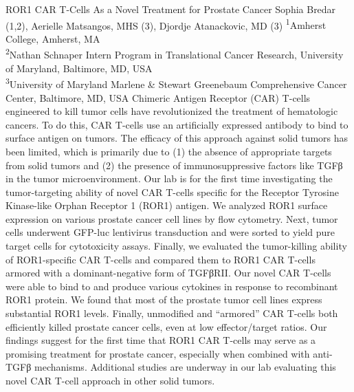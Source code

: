 \makeabstract
{
ROR1 CAR T-Cells As a Novel Treatment for Prostate Cancer
}
{
Sophia Bredar (1,2), Aerielle Matsangos, MHS (3), Djordje Atanackovic, MD (3)
}
{
\textsuperscript{1}Amherst College, Amherst, MA\\
\textsuperscript{2}Nathan Schnaper Intern Program in Translational Cancer Research, University of Maryland, Baltimore, MD, USA\\
\textsuperscript{3}University of Maryland Marlene \& Stewart Greenebaum Comprehensive Cancer Center, Baltimore, MD, USA
}
{
Chimeric Antigen Receptor (CAR) T-cells engineered to kill tumor cells have revolutionized the treatment of hematologic cancers. To do this, CAR T-cells use an artificially expressed antibody to bind to surface antigen on tumors. The efficacy of this approach against solid tumors has been limited, which is primarily due to (1) the absence of appropriate targets from solid tumors and (2) the presence of immunosuppressive factors like TGFβ in the tumor microenvironment. Our lab is for the first time investigating the tumor-targeting ability of novel CAR T-cells specific for the Receptor Tyrosine Kinase-like Orphan Receptor 1 (ROR1) antigen.
}
{
We analyzed ROR1 surface expression on various prostate cancer cell lines by flow cytometry. Next, tumor cells underwent GFP-luc lentivirus transduction and were sorted to yield pure target cells for cytotoxicity assays. Finally, we evaluated the tumor-killing ability of ROR1-specific CAR T-cells and compared them to ROR1 CAR T-cells armored with a dominant-negative form of TGFβRII.
}
{
Our novel CAR T-cells were able to bind to and produce various cytokines in response to recombinant ROR1 protein. We found that most of the prostate tumor cell lines express substantial ROR1 levels. Finally, unmodified and “armored” CAR T-cells both efficiently killed prostate cancer cells, even at low effector/target ratios.
}
{
Our findings suggest for the first time that ROR1 CAR T-cells may serve as a promising treatment for prostate cancer, especially when combined with anti-TGFβ mechanisms. Additional studies are underway in our lab evaluating this novel CAR T-cell approach in other solid tumors.
}

\newpage
